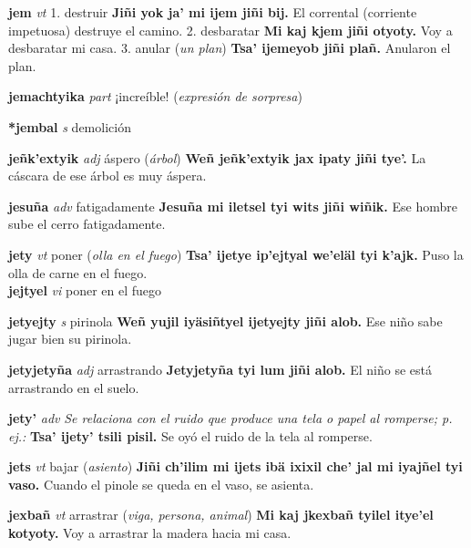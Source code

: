 \documentclass[10pt]{scrbook}
\newcommand{\entry}[1]{\textbf{#1}}
\newcommand{\onedefinition}[1]{#1.}
\newcommand{\nontranslationdef}[1]{\textit{#1}}
\newcommand{\partofspeech}[1]{\textit{#1}}
\newcommand{\spanishtranslation}[1]{#1}
\newcommand{\clarification}[1]{(\textit{#1})}
\newcommand{\cholexample}[1]{\textbf{#1}}
\newcommand{\exampletranslation}[1]{#1}
\newcommand{\secondaryentry}[1]{\\\textbf{#1}}
\newcommand{\secondpartofspeech}[1]{\textit{#1}}
\newcommand{\secondtranslation}[1]{#1}
\begin{document}
\begin{multicols}{2}
\entry{jem}
\partofspeech{vt}
\onedefinition{1}
\spanishtranslation{destruir}
\cholexample{Jiñi yok ja' mi ijem jiñi bij.}
\exampletranslation{El corrental (corriente impetuosa) destruye el camino.}
\onedefinition{2}
\spanishtranslation{desbaratar}
\cholexample{Mi kaj kjem jiñi otyoty.}
\exampletranslation{Voy a desbaratar mi casa.}
\onedefinition{3}
\spanishtranslation{anular}
\clarification{un plan}
\cholexample{Tsa' ijemeyob jiñi plañ.}
\exampletranslation{Anularon el plan.}

\entry{jemachtyika}
\partofspeech{part}
\spanishtranslation{¡increíble!}
\clarification{expresión de sorpresa}

\entry{*jembal}
\partofspeech{s}
\spanishtranslation{demolición}

\entry{jeñk'extyik}
\partofspeech{adj}
\spanishtranslation{áspero}
\clarification{árbol}
\cholexample{Weñ jeñk'extyik jax ipaty jiñi tye'.}
\exampletranslation{La cáscara de ese árbol es muy áspera.}

\entry{jesuña}
\partofspeech{adv}
\spanishtranslation{fatigadamente}
\cholexample{Jesuña mi iletsel tyi wits jiñi wiñik.}
\exampletranslation{Ese hombre sube el cerro fatigadamente.}

\entry{jety}
\partofspeech{vt}
\spanishtranslation{poner}
\clarification{olla en el fuego}
\cholexample{Tsa' ijetye ip'ejtyal we'eläl tyi k'ajk.}
\exampletranslation{Puso la olla de carne en el fuego.}
\secondaryentry{jejtyel}
\secondpartofspeech{vi}
\secondtranslation{poner en el fuego}

\entry{jetyejty}
\partofspeech{s}
\spanishtranslation{pirinola}
\cholexample{Weñ yujil iyäsiñtyel ijetyejty jiñi alob.}
\exampletranslation{Ese niño sabe jugar bien su pirinola.}

\entry{jetyjetyña}
\partofspeech{adj}
\spanishtranslation{arrastrando}
\cholexample{Jetyjetyña tyi lum jiñi alob.}
\exampletranslation{El niño se está arrastrando en el suelo.}

\entry{jety'}
\partofspeech{adv}
\nontranslationdef{Se relaciona con el ruido que produce una tela o papel al romperse; p. ej.:}
\cholexample{Tsa' ijety' tsili pisil.}
\exampletranslation{Se oyó el ruido de la tela al romperse.}

\entry{jets}
\partofspeech{vt}
\spanishtranslation{bajar}
\clarification{asiento}
\cholexample{Jiñi ch'ilim mi ijets ibä ixixil che' jal mi iyajñel tyi vaso.}
\exampletranslation{Cuando el pinole se queda en el vaso, se asienta.}

\entry{jexbañ}
\partofspeech{vt}
\spanishtranslation{arrastrar}
\clarification{viga, persona, animal}
\cholexample{Mi kaj jkexbañ tyilel itye'el kotyoty.}
\exampletranslation{Voy a arrastrar la madera hacia mi casa.}


\end{multicols}
\end{document}
